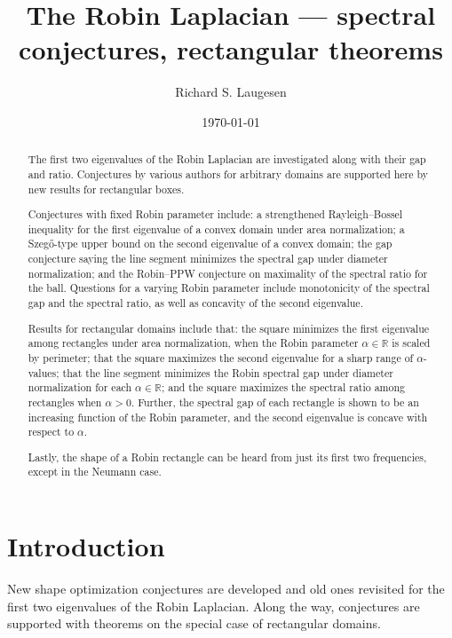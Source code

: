 \documentclass[12pt,reqno]{amsart}
\theoremstyle{definition}
\newcommand{\R}{{\mathbb R}}
\begin{document}
\title[Robin Laplacian --- conjectures and rectangles]{The Robin Laplacian --- spectral conjectures, rectangular theorems}
%
\author[]{Richard S. Laugesen}
\address{Department of Mathematics, University of Illinois, Urbana,
IL 61801, U.S.A.}
\date{\today}

\begin{abstract}
The first two eigenvalues of the Robin Laplacian are investigated along with their gap and ratio. Conjectures by various authors for arbitrary domains are supported here by new results for rectangular boxes. 

Conjectures with fixed Robin parameter include: a strengthened Rayleigh--Bossel inequality for the first eigenvalue of a convex domain under area normalization; a Szeg\H{o}-type upper bound on the second eigenvalue of a convex domain; the gap conjecture saying the line segment minimizes the spectral gap under diameter normalization; and the Robin--PPW conjecture on maximality of the spectral ratio for the ball. Questions for a varying Robin parameter include monotonicity of the spectral gap and the spectral ratio, as well as  concavity of the second eigenvalue. 

Results for rectangular domains include that: the square minimizes the first eigenvalue among rectangles under area normalization, when the Robin parameter $\alpha \in \R$ is scaled by perimeter; that the square maximizes the second eigenvalue for a sharp range of $\alpha$-values; that the line segment minimizes the Robin spectral gap under diameter normalization for each $\alpha \in \R$; and the square maximizes the spectral ratio among rectangles when $\alpha>0$. Further, the spectral gap of each rectangle is shown to be an increasing function of the Robin parameter, and the second eigenvalue is concave with respect to $\alpha$. 

Lastly, the shape of a Robin rectangle can be heard from just its first two frequencies, except in the Neumann case.  
\end{abstract}

\maketitle

\section{\bf Introduction}
\label{intro}

New shape optimization conjectures are developed and old ones revisited for the first two eigenvalues of the Robin Laplacian. Along the way, conjectures are supported with theorems on the special case of rectangular domains. 
\end{document}
